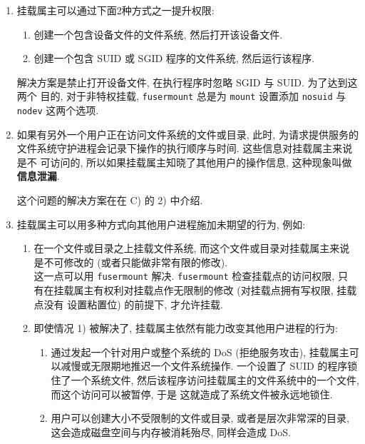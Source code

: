 \documentclass[nofonts]{ctexart}
\begin{document}
\def\labelenumi{\Alph{enumi})}
\def\labelenumii{\arabic{enumii})}
\def\labelenumiii{\roman{enumiii})}
\begin{enumerate}
    \item
        挂载属主可以通过下面2种方式之一提升权限:
        \begin{enumerate}
            \item
                创建一个包含设备文件的文件系统, 然后打开该设备文件.\\
            \item
                创建一个包含 SUID 或 SGID 程序的文件系统, 然后运行该程序.
        \end{enumerate}

        解决方案是禁止打开设备文件, 在执行程序时忽略 SGID 与 SUID.
        为了达到这两个 目的, 对于非特权挂载, \texttt{fusermount} 总是为
        \texttt{mount} 设置添加 \texttt{nosuid} 与 \texttt{nodev} 这两个选项.

    \item
        如果有另外一个用户正在访问文件系统的文件或目录, 此时,
        为请求提供服务的 文件系统守护进程会记录下操作的执行顺序与时间.
        这些信息对挂载属主来说是不 可访问的,
        所以如果挂载属主知晓了其他用户的操作信息, 这种现象叫做
        \textbf{信息泄漏}.

        这个问题的解决方案在在 C) 的 2) 中介绍.

    \item
        挂载属主可以用多种方式向其他用户进程施加未期望的行为, 例如:
        \begin{enumerate}
            \item
                在一个文件或目录之上挂载文件系统, 而这个文件或目录对挂载属主来说
                是不可修改的 (或者只能做非常有限的修改).\\这一点可以用
                \texttt{fusermount} 解决. \texttt{fusermount} 检查挂载点的访问权限,
                只 有在挂载属主有权利对挂载点作无限制的修改 (对挂载点拥有写权限,
                挂载点没有 设置粘置位) 的前提下, 才允许挂载.
            \item
                即使情况 1) 被解决了, 挂载属主依然有能力改变其他用户进程的行为:
                \begin{enumerate}
                    \item
                        通过发起一个针对用户或整个系统的 DoS (拒绝服务攻击),
                        挂载属主可以减慢或无限期地推迟一个文件系统操作. 一个设置了 SUID
                        的程序锁住了一个系统文件,
                        然后该程序访问挂载属主的文件系统中的一个文件,
                        而这个访问可以被暂停, 于是 这就造成了系统文件被永远地锁住.
                    \item
                        用户可以创建大小不受限制的文件或目录, 或者是层次非常深的目录,
                        这会造成磁盘空间与内存被消耗殆尽, 同样会造成 DoS.
                \end{enumerate}
        \end{enumerate}
\end{enumerate}
\end{document}

